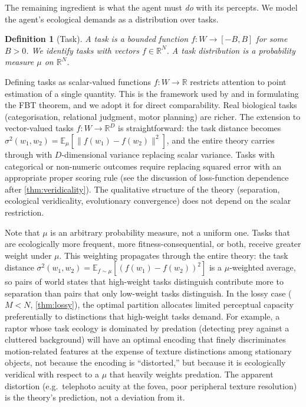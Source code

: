 \documentclass[12pt]{article}
\newtheorem{definition}[theorem]{Definition}
\newcommand{\sigmasq}{\sigma^2}
\newcommand{\E}{\mathbb{E}}
\newcommand{\R}{\mathbb{R}}
\begin{document}
The remaining ingredient is what the agent must \emph{do} with its percepts. We model the agent's ecological demands as a distribution over tasks.

\begin{definition}[Task]\label{def:task}
A \emph{task} is a bounded function $f\colon W \to [-B, B]$ for some $B > 0$. We identify tasks with vectors $f \in \R^N$. A \emph{task distribution} is a probability measure $\mu$ on $\R^N$.
\end{definition}

Defining tasks as scalar-valued functions $f\colon W \to \R$ restricts attention to point estimation of a single quantity. This is the framework used by \citet{hoffman_etal_2015} and \citet{prakash_etal_2021} in formulating the FBT theorem, and we adopt it for direct comparability. Real biological tasks (categorisation, relational judgment, motor planning) are richer. The extension to vector-valued tasks $f\colon W \to \R^D$ is straightforward: the task distance becomes $\sigmasq(w_1, w_2) = \E_\mu[\|f(w_1) - f(w_2)\|^2]$, and the entire theory carries through with $D$-dimensional variance replacing scalar variance. Tasks with categorical or non-numeric outcomes require replacing squared error with an appropriate proper scoring rule (see the discussion of loss-function dependence after \cref{thm:veridicality}). The qualitative structure of the theory (separation, ecological veridicality, evolutionary convergence) does not depend on the scalar restriction.

Note that $\mu$ is an arbitrary probability measure, not a uniform one. Tasks that are ecologically more frequent, more fitness-consequential, or both, receive greater weight under $\mu$. This weighting propagates through the entire theory: the task distance $\sigmasq(w_1, w_2) = \E_{f \sim \mu}[(f(w_1) - f(w_2))^2]$ is a $\mu$-weighted average, so pairs of world states that high-weight tasks distinguish contribute more to separation than pairs that only low-weight tasks distinguish. In the lossy case ($M < N$, \cref{thm:lossy}), the optimal partition allocates limited perceptual capacity preferentially to distinctions that high-weight tasks demand. For example, a raptor whose task ecology is dominated by predation (detecting prey against a cluttered background) will have an optimal encoding that finely discriminates motion-related features at the expense of texture distinctions among stationary objects, not because the encoding is ``distorted,'' but because it is ecologically veridical with respect to a $\mu$ that heavily weights predation. The apparent distortion (e.g.\ telephoto acuity at the fovea, poor peripheral texture resolution) is the theory's prediction, not a deviation from it.
\end{document}

